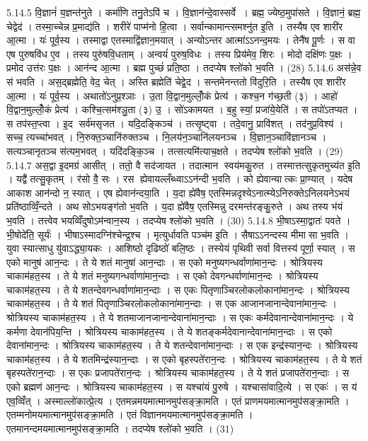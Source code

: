 5.14.5
वि॒ज्ञानं॑ य॒ज्ञन्त॑नुते । कर्मा॑णि तनु॒तेऽपि॑ च । वि॒ज्ञान॑न्दे॒वास्सर्वे । ब्रह्म॒ ज्येष्ठ॒मुपा॑सते । वि॒ज्ञानं॒ ब्रह्म॒ चेद्वेद॑ । तस्मा॒च्चेन्न प्र॒माद्य॑ति । शरीरे॑ पाप्म॑नो हि॒त्वा । सर्वान्कामान्त्समश्नु॑त इ॒ति । तस्यैष एव शारी॑र आ॒त्मा । यः॑ पूर्व॒स्य । तस्माद्वा एतस्माद्वि॑ज्ञान॒मयात् । अन्योऽन्तर आत्मा॑ऽऽनन्द॒मयः । तेनै॑ष पू॒र्णः । स वा एष पुरुषवि॑ध ए॒व । तस्य पुरु॑षवि॒धताम् । अन्वयं॑ पुरुष॒विधः । तस्य प्रिय॑मेव॒ शिरः । मोदो दक्षि॑णः प॒क्षः । प्रमोद उत्त॑रः प॒क्षः । आन॑न्द आ॒त्मा । ब्रह्म पुच्छं॑ प्रति॒ष्ठा । तदप्येष श्लो॑को भ॒वति । (28)
5.14.6
अस॑न्ने॒व स॑ भवति । अस॒द्ब्रह्मेति॒ वेद॒ चेत् । अस्ति ब्रह्मेति॑ चेद्वे॒द । सन्तमेनन्ततो वि॑दुरि॒ति । तस्यैष एव शारी॑र आ॒त्मा । यः॑ पूर्व॒स्य । अथातो॑ऽनुप्र॒श्ञाः । उ॒ता वि॒द्वान॒मुल्लोँ॒कं प्रेत्य॑ । कश्च॒न ग॑च्छ॒ती (३) । आहो॑ वि॒द्वान॒मुल्लोँ॒कं प्रेत्य॑ । कश्चि॒त्सम॑श्ञु॒ता (३) उ॒ । सो॑ऽकामयत । ब॒हु स्यां॒ प्रजा॑ये॒येति॑ । स तपो॑ऽतप्यत । स तप॑स्त॒प्त्वा । इ॒द सर्व॑मसृजत । यदि॒दङ्किञ्च॑ । तत्सृ॒ष्ट्वा । तदे॒वानु॒ प्रावि॑शत् । तद॑नुप्र॒विश्य॑ । सच्च॒ त्यच्चा॑भवत् । नि॒रुक्त॒ञ्चानि॑रुक्तञ्च । नि॒लय॑न॒ञ्चानि॑लयनञ्च । वि॒ज्ञान॒ञ्चावि॑ज्ञानञ्च । सत्यञ्चानृतञ्च स॑त्यम॒भवत् । यदि॑दङ्कि॒ञ्च । तत्सत्यमि॑त्याच॒क्षते । तदप्येष श्लो॑को भ॒वति । (29)
5.14.7
अस॒द्वा इ॒दमग्र॑ आसीत् । ततो॒ वै सद॑जायत । तदात्मान स्वय॑मकु॒रुत । तस्मात्तत्सुकृतमुच्य॑त इ॒ति । यद्वै॑ तत्सु॒कृतम् । र॑सो वै॒ सः । रस ह्येवायल्लँब्ध्वाऽऽन॑न्दी भ॒वति । को ह्येवान्यात्कः प्रा॒ण्यात् । यदेष आकाश आन॑न्दो न॒ स्यात् । एष ह्येवान॑न्दया॒ति । य॒दा ह्ये॑वैष॒ एतस्मिन्नदृश्येऽनात्म्येऽनिरुक्तेऽनिलयनेऽभयं प्रति॑ष्ठाव्विँ॒न्दते । अथ सोऽभयङ्ग॑तो भ॒वति । य॒दा ह्ये॑वैष॒ एतस्मिन्नु दरमन्त॑रङ्कु॒रुते । अथ तस्य भ॑यं भ॒वति । तत्त्वेव भयव्विँदुषोऽम॑न्वान॒स्य । तदप्येष श्लो॑को भ॒वति । (30)
5.14.8
भी॒षाऽस्मा॒द्वातः॑ पवते । भी॒षोदे॑ति॒ सूर्यः॑ । भीषाऽस्मादग्नि॑श्चेन्द्र॒श्च । मृत्युर्धावति पञ्च॑म इ॒ति । सैषाऽऽनन्दस्य मीमासा भ॒वति । युवा स्यात्साधु यु॑वाऽद्ध्या॒यकः । आशिष्ठो दृढिष्ठो॑ बलि॒ष्ठः । तस्येयं पृथिवी सर्वा वित्तस्य॑ पूर्णा॒ स्यात् । स एको मानुष॑ आन॒न्दः । ते ये शतं मानुषा॑ आन॒न्दाः । स एको मनुष्यगन्धर्वाणा॑मान॒न्दः । श्रोत्रियस्य चाकाम॑हत॒स्य । ते ये शतं मनुष्यगन्धर्वाणा॑मान॒न्दाः । स एको देवगन्धर्वाणा॑मान॒न्दः । श्रोत्रियस्य चाकाम॑हत॒स्य । ते ये शतन्देवगन्धर्वाणा॑मान॒न्दाः । स एकः पितृणाञ्चिरलोकलोकाना॑मान॒न्दः । श्रोत्रियस्य चाकाम॑हत॒स्य । ते ये शतं पितृणाञ्चिरलोकलोकाना॑मान॒न्दाः । स एक आजानजानान्देवाना॑मान॒न्दः । श्रोत्रियस्य चाकाम॑हत॒स्य । ते ये शतमाजानजानान्देवाना॑मान॒न्दाः । स एकः कर्मदेवानान्देवाना॑मान॒न्दः । ये कर्मणा देवान॑पिय॒न्ति । श्रोत्रियस्य चाकाम॑हत॒स्य । ते ये शतङ्कर्मदेवानान्देवाना॑मान॒न्दाः । स एको देवाना॑मान॒न्दः । श्रोत्रियस्य चाकाम॑हत॒स्य । ते ये शतन्देवाना॑मान॒न्दाः । स एक इन्द्र॑स्यान॒न्दः । श्रोत्रियस्य चाकाम॑हत॒स्य । ते ये शतमिन्द्र॑स्यान॒न्दाः । स एको बृहस्पते॑रान॒न्दः । श्रोत्रियस्य चाकाम॑हत॒स्य । ते ये शतं बृहस्पते॑रान॒न्दाः । स एकः प्रजापते॑रान॒न्दः । श्रोत्रियस्य चाकाम॑हत॒स्य । ते ये शतं प्रजापते॑रान॒न्दाः । स एको ब्रह्मण॑ आन॒न्दः । श्रोत्रियस्य चाकाम॑हत॒स्य । स यश्चा॑यं पु॒रुषे । यश्चासा॑वादि॒त्ये । स एकः॑ । स य॑ एव॒व्विँत् । अस्माल्लो॑कात्प्रे॒त्य । एतमन्नमयमात्मानमुप॑सङ्क्रा॒मति । एतं प्राणमयमात्मानमुप॑सङ्क्रा॒मति । एतम्मनोमयमात्मानमुप॑सङ्क्रा॒मति । एतं विज्ञानमयमात्मानमुप॑सङ्क्रा॒मति । एतमानन्दमयमात्मानमुप॑सङ्क्रा॒मति । तदप्येष श्लो॑को भ॒वति । (31)
